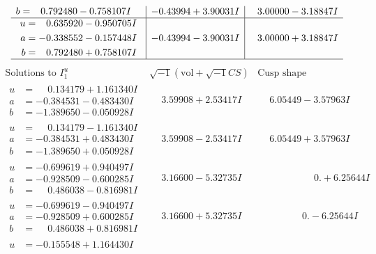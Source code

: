 \documentclass[1p]{elsarticle_modified}
\theoremstyle{definition}
\newcommand{\I}{\sqrt{-1}}
\begin{document}
$$\begin{array}{c|c|c}
\begin{aligned}
b &= \phantom{-}0.792480 - 0.758107 I\end{aligned}
 & -0.43994 + 3.90031 I & \phantom{-}3.00000 - 3.18847 I \\ \hline\begin{aligned}
u &= \phantom{-}0.635920 - 0.950705 I \\
a &= -0.338552 - 0.157448 I \\
b &= \phantom{-}0.792480 + 0.758107 I\end{aligned}
 & -0.43994 - 3.90031 I & \phantom{-}3.00000 + 3.18847 I\\
 \hline 
 \end{array}$$\newpage$$\begin{array}{c|c|c}  
\text{Solutions to }I^u_{1}& \I (\text{vol} + \sqrt{-1}CS) & \text{Cusp shape}\\
 \hline 
\begin{aligned}
u &= \phantom{-}0.134179 + 1.161340 I \\
a &= -0.384531 - 0.483430 I \\
b &= -1.389650 - 0.050928 I\end{aligned}
 & \phantom{-}3.59908 + 2.53417 I & \phantom{-}6.05449 - 3.57963 I \\ \hline\begin{aligned}
u &= \phantom{-}0.134179 - 1.161340 I \\
a &= -0.384531 + 0.483430 I \\
b &= -1.389650 + 0.050928 I\end{aligned}
 & \phantom{-}3.59908 - 2.53417 I & \phantom{-}6.05449 + 3.57963 I \\ \hline\begin{aligned}
u &= -0.699619 + 0.940497 I \\
a &= -0.928509 - 0.600285 I \\
b &= \phantom{-}0.486038 - 0.816981 I\end{aligned}
 & \phantom{-}3.16600 - 5.32735 I & \phantom{-0.000000 -}0. + 6.25644 I \\ \hline\begin{aligned}
u &= -0.699619 - 0.940497 I \\
a &= -0.928509 + 0.600285 I \\
b &= \phantom{-}0.486038 + 0.816981 I\end{aligned}
 & \phantom{-}3.16600 + 5.32735 I & \phantom{-0.000000 } 0. - 6.25644 I \\ \hline\begin{aligned}
u &= -0.155548 + 1.164430 I \\

\end{aligned}
\end{array}$$
\end{document}
